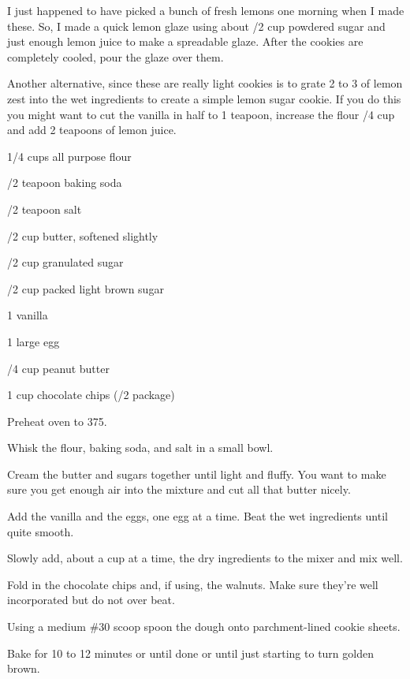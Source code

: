 \begin{ChefNotes}
    {I just happened to have picked a bunch of fresh lemons one morning when I
        made these. So, I made a quick lemon glaze using about /2 cup powdered sugar and
        just enough lemon juice to make a spreadable glaze. After the cookies are completely cooled,
        pour the glaze over them.

        Another alternative, since these are really light cookies is to grate 2 to 3 \Tbl[s] of
        lemon zest into the wet ingredients to create a simple lemon sugar cookie. If you do this you
        might want to cut the vanilla in half to 1 teapoon, increase the flour /4 cup and
        add 2 teapoons of lemon juice.}
\end{ChefNotes}
%
%
%
%
\newpage



\begin{IngredientsAndSteps}
    \ListIngredientsAndSteps
    {
        1/4 cups all purpose flour

        /2 teapoon baking soda

        /2 teapoon salt

        \IngredientsSeparatorClear

        /2 cup butter, softened slightly

        /2 cup granulated sugar

        /2 cup packed light brown sugar

        \IngredientsSeparatorClear

        1 \tsp vanilla

        1 large egg

        /4 cup peanut butter

        1 cup chocolate chips (/2 package)
    }
    {
        Preheat oven to 375\Degrees[F].

        Whisk the flour, baking soda, and salt in a small bowl.

        Cream the butter and sugars together until light and fluffy. You want to make sure you get
        enough air into the mixture and cut all that butter nicely.

        Add the vanilla and the eggs, one egg at a time. Beat the wet ingredients until quite smooth.

        Slowly add, about a cup at a time, the dry ingredients to the mixer and mix well.

        Fold in the chocolate chips and, if using, the walnuts. Make sure they're well
        incorporated but do not over beat.

        Using a medium \#30 scoop spoon the dough onto parchment-lined cookie sheets.

        Bake for 10 to 12 minutes or until done or until just starting to turn golden brown.
    }
\end{IngredientsAndSteps}

